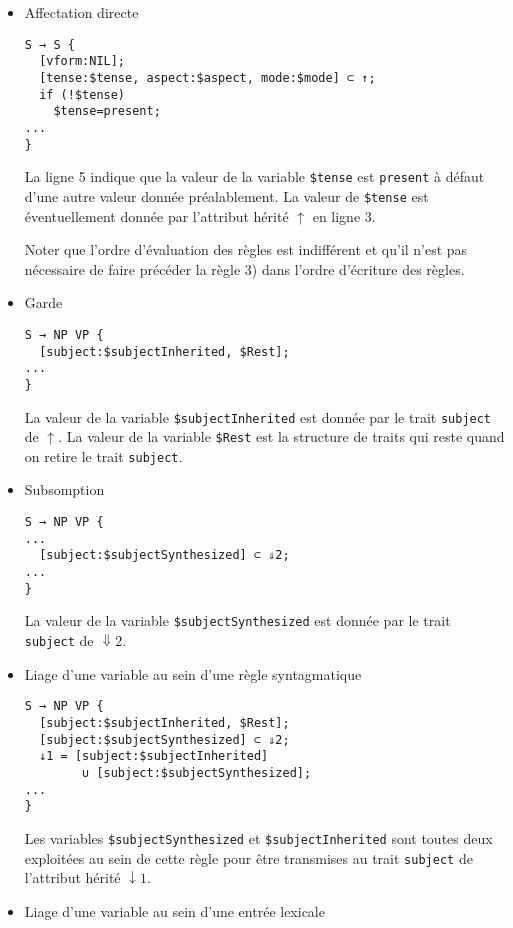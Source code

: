 \documentclass[11pt]{article}
\begin{document}
\begin{itemize}
\item Affectation directe
\begin{lstlisting}
S → S {
  [vform:NIL];
  [tense:$tense, aspect:$aspect, mode:$mode] ⊂ ↑;
  if (!$tense)
    $tense=present;
...
}
\end{lstlisting}
La ligne 5 indique que la valeur de la variable \verb#$tense# est
\verb#present# à défaut d'une autre valeur donnée préalablement. La
valeur de
\verb#$tense# est éventuellement donnée par l'attribut hérité
$\uparrow$ en ligne 3.

Noter que l'ordre d'évaluation des règles est indifférent et qu'il
n'est pas nécessaire de faire précéder la règle 3) dans l'ordre
d'écriture des règles.

\item Garde
\begin{lstlisting}[numbers=none]
S → NP VP {
  [subject:$subjectInherited, $Rest];
...
}
\end{lstlisting}

La valeur de la variable \verb#$subjectInherited# est donnée 
par le trait \verb#subject# de $\uparrow$. La valeur de la variable 
\verb#$Rest# est la structure de traits qui reste quand on retire le
trait \verb#subject#.

\item Subsomption
\begin{lstlisting}[numbers=none]
S → NP VP {
...
  [subject:$subjectSynthesized] ⊂ ⇓2;
...
}
\end{lstlisting}

La valeur de la variable \verb#$subjectSynthesized# est donnée 
par le trait \verb#subject# de $\Downarrow2$. 

\item Liage d'une variable au sein d'une règle syntagmatique
\begin{lstlisting}[numbers=none]
S → NP VP {
  [subject:$subjectInherited, $Rest];
  [subject:$subjectSynthesized] ⊂ ⇓2;
  ↓1 = [subject:$subjectInherited] 
  		∪ [subject:$subjectSynthesized];
...
}
\end{lstlisting}

Les variables \verb#$subjectSynthesized# et \verb#$subjectInherited#
sont toutes deux exploitées au sein de cette règle pour  être
transmises au trait \verb#subject# de l'attribut hérité $\downarrow1$.

\item Liage d'une variable au sein d'une entrée lexicale


\end{itemize}
\end{document}
